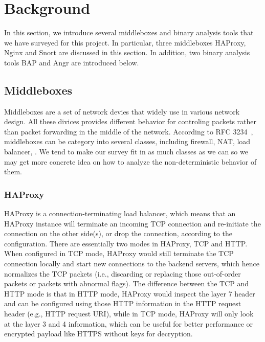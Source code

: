 \section{Background}

In this section, we introduce several middleboxes and binary analysis tools that
we have surveyed for this project. In particular, three middleboxes \ca HAProxy,
\cb Nginx and \cc Snort are discussed in this section.  In addition, two binary
analysis tools \ca BAP and \cb Angr are introduced below.


\subsection{Middleboxes}

Middleboxes are a set of network devies that widely use in various network
design.  All these divices provides different behavior for controling packets
rather than packet forwarding in the middle of the network.  According to RFC
3234~\cite{rfc3234}, middleboxes can be category into several classes, including
firewall, NAT, load balancer, \etc.  We tend to make our survey fit in as much
classes as we can so we may get more concrete idea on how to analyze the
non-deterministic behavior of them.

\subsubsection{HAProxy}

HAProxy is a connection-terminating load balancer, which means that an HAProxy
instance will terminate an incoming TCP connection and re-initiate the
connection on the other side(s), or drop the connection, according to the
configuration. There are essentially two modes in HAProxy, TCP and HTTP. When
configured in TCP mode, HAProxy would still terminate the TCP connection locally
and start new connections to the backend servers, which hence normalizes the TCP
packets (i.e., discarding or replacing those out-of-order packets or packets
with abnormal flags). The difference between the TCP and HTTP mode is that in
HTTP mode, HAProxy would inspect the layer 7 header and can be configured using
those HTTP information in the HTTP request header (e.g., HTTP request URI),
while in TCP mode, HAProxy will only look at the layer 3 and 4 information,
which can be useful for better performance or encrypted payload like HTTPS
without keys for decryption.

